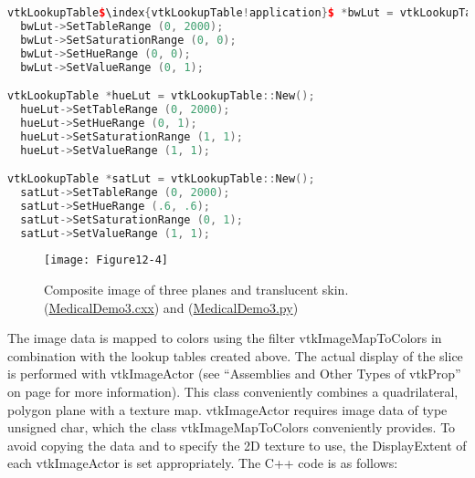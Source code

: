 \begin{lstlisting}[language=C++, caption={Lookup tables for the sectioning planes.}, escapechar=\$]
vtkLookupTable$\index{vtkLookupTable!application}$ *bwLut = vtkLookupTable::New();
  bwLut->SetTableRange (0, 2000);
  bwLut->SetSaturationRange (0, 0);
  bwLut->SetHueRange (0, 0);
  bwLut->SetValueRange (0, 1);

vtkLookupTable *hueLut = vtkLookupTable::New();
  hueLut->SetTableRange (0, 2000);
  hueLut->SetHueRange (0, 1);
  hueLut->SetSaturationRange (1, 1);
  hueLut->SetValueRange (1, 1);

vtkLookupTable *satLut = vtkLookupTable::New();
  satLut->SetTableRange (0, 2000);
  satLut->SetHueRange (.6, .6);
  satLut->SetSaturationRange (0, 1);
  satLut->SetValueRange (1, 1);
\end{lstlisting}

\begin{figure}[!htb]
	\centering
	\texttt{[image: Figure12-4]}
	\caption{Composite image of three planes and translucent skin.(\href{https://lorensen.github.io/VTKExamples/site/Cxx/Medical/MedicalDemo3/}{MedicalDemo3.cxx}) and (\href{https://lorensen.github.io/VTKExamples/site/Python/Medical/MedicalDemo3/}{MedicalDemo3.py})}
	\label{fig:Figure12-4}
\end{figure}

The image data is mapped to colors using the filter vtkImageMapToColors in combination with the lookup tables created above. The actual display of the slice is performed with vtkImageActor (see ``Assemblies and Other Types of vtkProp'' on page \pageref{subsubsec:assemblies_vtkprop} for more information). This class conveniently combines a quadrilateral, polygon plane with a texture map. vtkImageActor requires image data of type unsigned char, which the class vtkImageMapToColors conveniently provides. To avoid copying the data and to specify the 2D texture to use, the DisplayExtent of each vtkImageActor is set appropriately. The C++ code is as follows:

